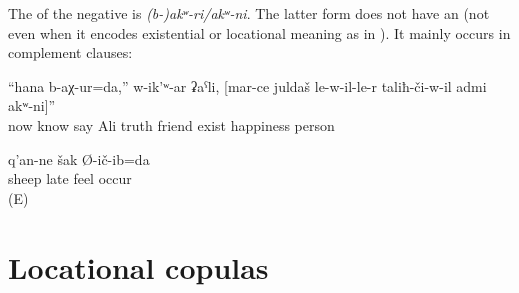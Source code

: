 The  of the negative  is \textit{{(b-)akʷ-ri\slash akʷ-ni}}. The latter form does not have an  (not even when it encodes existential or locational meaning as in ). It mainly occurs in complement clauses:
%
\begin{exe}
	\ex	\label{ex:Now I know, says Ali, that there is no happy man than the one who has a true friend}
	\gll	``hana	b-aχ-ur=da,''	w-ik'ʷ-ar	ʡaˁli,	[mar-ce	juldaš	le-w-il-le-r	taliħ-či-w-il	admi	akʷ-ni]''\\
		now	know	say	Ali	truth	friend	exist	happiness	person	\\
	\glt	{}

	\ex	\label{ex:I guessed late that my sheep were not there}
		q'an-ne	šak	Ø-ič-ib=da\\
			sheep		late	feel	occur\\
	\glt	{} (E)
\end{exe}



\section{Locational copulas}
\label{sec:Locational copulae}


